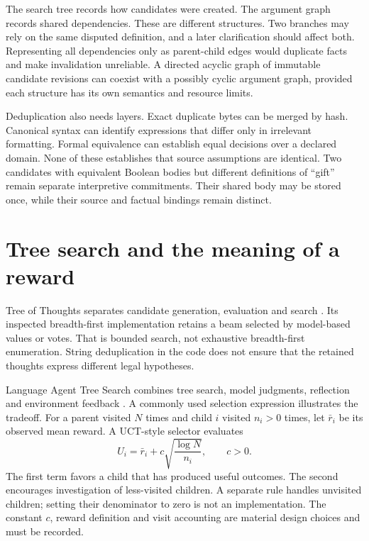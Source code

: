 \documentclass[12pt,a4paper,oneside,openany]{book}
\begin{document}
The search tree records how candidates were created. The argument graph records
shared dependencies. These are different structures. Two branches may rely on
the same disputed definition, and a later clarification should affect both.
Representing all dependencies only as parent-child edges would duplicate facts
and make invalidation unreliable. A directed acyclic graph of immutable candidate
revisions can coexist with a possibly cyclic argument graph, provided each
structure has its own semantics and resource limits.

Deduplication also needs layers. Exact duplicate bytes can be merged by hash.
Canonical syntax can identify expressions that differ only in irrelevant
formatting. Formal equivalence can establish equal decisions over a declared
domain. None of these establishes that source assumptions are identical. Two
candidates with equivalent Boolean bodies but different definitions of ``gift''
remain separate interpretive commitments. Their shared body may be stored once,
while their source and factual bindings remain distinct.

\section{Tree search and the meaning of a reward}

Tree of Thoughts separates candidate generation, evaluation and search
\citep[section 3]{treeofthoughts2023}. Its inspected breadth-first implementation
retains a beam selected by model-based values or votes. That is bounded search,
not exhaustive breadth-first enumeration. String deduplication in the code does
not ensure that the retained thoughts express different legal hypotheses.

Language Agent Tree Search combines tree search, model judgments, reflection and
environment feedback \citep[sections 3.2--4 and appendix A]{lats2024}. A commonly
used selection expression illustrates the tradeoff. For a parent visited $N$
times and child $i$ visited $n_i>0$ times, let $\bar r_i$ be its observed mean
reward. A UCT-style selector evaluates
\begin{equation}
 U_i=\bar r_i+c\sqrt{\frac{\log N}{n_i}},\qquad c>0.
 \label{eq:uct}
\end{equation}
The first term favors a child that has produced useful outcomes. The second
encourages investigation of less-visited children. A separate rule handles
unvisited children; setting their denominator to zero is not an implementation.
The constant $c$, reward definition and visit accounting are material design
choices and must be recorded.
\end{document}
